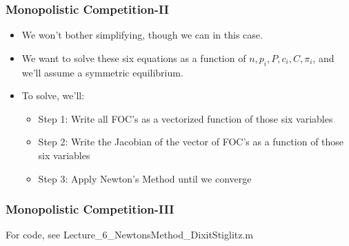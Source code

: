 \documentclass{beamer}
\begin{document}
\begin{frame}
\frametitle[alignment=center]{Monopolistic Competition-II}
\begin{itemize}
\bigskip
\item We won't bother simplifying, though we can in this case.
\bigskip
\item We want to solve these six equations as a function of $n,p_i,P,c_i,C,\pi_i$, and we'll assume a symmetric equilibrium.
\bigskip
\item To solve, we'll:
\bigskip
\begin{itemize}
\item Step 1:  Write all FOC's as a vectorized function of those six variables
\bigskip
\item Step 2:  Write the Jacobian of the vector of FOC's as a function of those six variables
\bigskip
\item Step 3:  Apply Newton's Method until we converge
\end{itemize}
\end{itemize}
\end{frame}


\begin{frame}
\frametitle[alignment=center]{Monopolistic Competition-III}
For code, see Lecture\_6\_NewtonsMethod\_DixitStiglitz.m
\end{frame}

\end{document}
